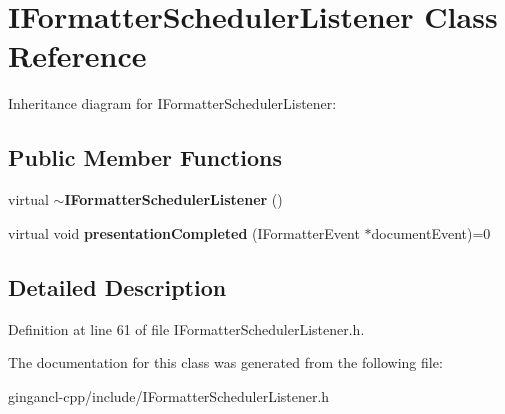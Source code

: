 \section{IFormatterSchedulerListener Class Reference}
\label{classbr_1_1pucrio_1_1telemidia_1_1ginga_1_1ncl_1_1IFormatterSchedulerListener}
Inheritance diagram for IFormatterSchedulerListener:\subsection*{Public Member Functions}
\begin{CompactItemize}
\item 
virtual {\bf $\sim$IFormatterSchedulerListener} ()\label{classbr_1_1pucrio_1_1telemidia_1_1ginga_1_1ncl_1_1IFormatterSchedulerListener_126a5e077f7abcfbe0081fd3fffd0db3}

\item 
virtual void \textbf{presentationCompleted} (IFormatterEvent $\ast$documentEvent)=0\label{classbr_1_1pucrio_1_1telemidia_1_1ginga_1_1ncl_1_1IFormatterSchedulerListener_5cb11718b79c766368490553df39d141}

\end{CompactItemize}


\subsection{Detailed Description}




Definition at line 61 of file IFormatterSchedulerListener.h.

The documentation for this class was generated from the following file:\begin{CompactItemize}
\item 
gingancl-cpp/include/IFormatterSchedulerListener.h\end{CompactItemize}
